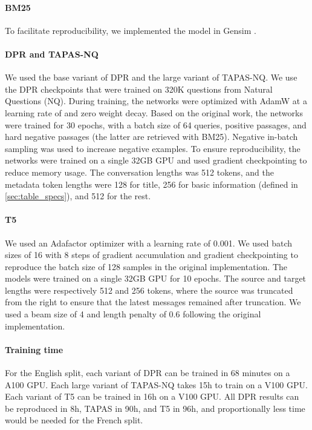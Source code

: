 \documentclass[11pt]{article}
\begin{document}
\paragraph{BM25} To facilitate reproducibility, we implemented the model in Gensim \citep{rehurek_software_2010}.

\paragraph{DPR and TAPAS-NQ} We used the base variant of DPR and the large variant of TAPAS-NQ. We use the DPR checkpoints that were trained on 320K questions from Natural Questions \citep{kwiatkowski_natural_2019} (NQ). During training, the networks were optimized with AdamW \citep{Loshchilov2017DecoupledWD} at a learning rate of  and zero weight decay. Based on the original work, the networks were trained for 30 epochs, with a batch size of 64 queries, positive passages, and hard negative passages (the latter are retrieved with BM25). Negative in-batch sampling was used to increase negative examples. To ensure reproducibility, the networks were trained on a single 32GB GPU and used gradient checkpointing \citep{chen_training_2016} to reduce memory usage. The conversation lengths was 512 tokens, and the metadata token lengths were 128 for title, 256 for basic information (defined in \autoref{sec:table_specs}), and 512 for the rest. 

\paragraph{T5} We used an Adafactor optimizer \citep{pmlr-v80-shazeer18a} with a learning rate of 0.001. We used batch sizes of 16 with 8 steps of gradient accumulation and gradient checkpointing to reproduce the batch size of 128 samples in the original implementation. The models were trained on a single 32GB GPU for 10 epochs. The source and target lengths were respectively 512 and 256 tokens, where the source was truncated from the right to ensure that the latest messages remained after truncation. We used a beam size of 4 and length penalty of 0.6 following the original implementation.

\paragraph{Training time} For the English split, each variant of DPR can be trained in 68 minutes on a A100 GPU. Each large variant of TAPAS-NQ takes 15h to train on a V100 GPU. Each variant of T5 can be trained in 16h on a V100 GPU. All DPR results can be reproduced in 8h, TAPAS in 90h, and T5 in 96h, and proportionally less time would be needed for the French split.
\end{document}
